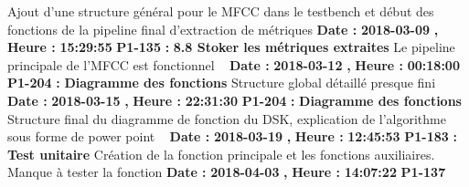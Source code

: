 \documentclass{article}%
\begin{document}
\newline%
\newline%
%
Ajout d'une structure général pour le MFCC dans le testbench et début des fonctions de la pipeline final d'extraction de métriques\newline%
\newline%
%
\textbf{Date : }%
\textbf{2018{-}03{-}09}%
\textbf{,}%
\textbf{ Heure : }%
\textbf{15:29:55}%
\newline%
%
\textbf{P1{-}135 }%
\textbf{ : }%
\textbf{ 8.8 Stoker les métriques extraites}%
\newline%
\newline%
%
Le pipeline principale de l'MFCC est fonctionnel\newline%
~\newline%
\newline%
%
\textbf{Date : }%
\textbf{2018{-}03{-}12}%
\textbf{,}%
\textbf{ Heure : }%
\textbf{00:18:00}%
\newline%
%
\textbf{P1{-}204 }%
\textbf{ : }%
\textbf{ Diagramme des fonctions}%
\newline%
\newline%
%
Structure global détaillé presque fini\newline%
~\newline%
\newline%
%
\textbf{Date : }%
\textbf{2018{-}03{-}15}%
\textbf{,}%
\textbf{ Heure : }%
\textbf{22:31:30}%
\newline%
%
\textbf{P1{-}204 }%
\textbf{ : }%
\textbf{ Diagramme des fonctions}%
\newline%
\newline%
%
Structure final du diagramme de fonction du DSK, explication de l'algorithme sous forme de power point\newline%
~\newline%
\newline%
%
\textbf{Date : }%
\textbf{2018{-}03{-}19}%
\textbf{,}%
\textbf{ Heure : }%
\textbf{12:45:53}%
\newline%
%
\textbf{P1{-}183 }%
\textbf{ : }%
\textbf{ Test unitaire}%
\newline%
\newline%
%
Création de la fonction principale et les fonctions auxiliaires. Manque à tester la fonction\newline%
\newline%
%
\textbf{Date : }%
\textbf{2018{-}04{-}03}%
\textbf{,}%
\textbf{ Heure : }%
\textbf{14:07:22}%
\newline%
%
\textbf{P1{-}137 }%
\end{document}
